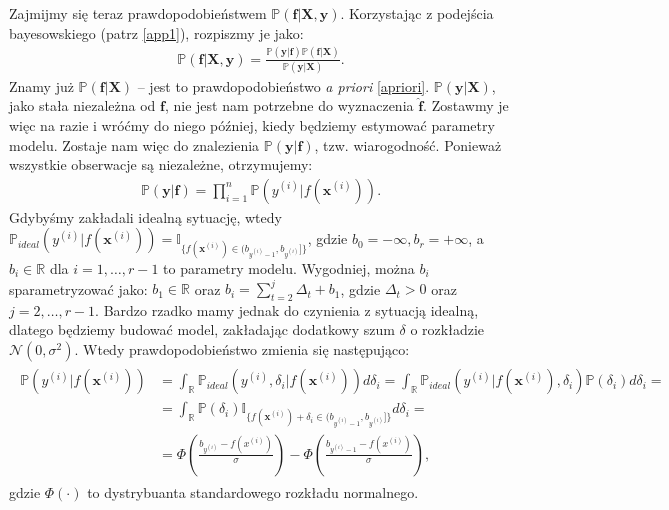 \documentclass{mini}
\begin{document}
Zajmijmy się teraz prawdopodobieństwem $\mathbb{P}(\mathbf{f} | \textbf{X}, \textbf{y})$. Korzystając z podejścia bayesowskiego (patrz \ref{app1}), rozpiszmy je jako:
\begin{align}\label{bayes}
\mathbb{P}(\mathbf{f} | \textbf{X}, \textbf{y}) 
=
\frac{
\mathbb{P}(\mathbf{y} | \textbf{f})
\mathbb{P}(\mathbf{f} | \textbf{X})
}{
\mathbb{P}(\mathbf{y} | \textbf{X})
}. 
\end{align}
Znamy już $\mathbb{P}(\mathbf{f} | \textbf{X})$ -- jest to prawdopodobieństwo \textit{a priori} \eqref{apriori}. $\mathbb{P}(\mathbf{y} | \textbf{X})$, jako stała niezależna od $\mathbf{f}$, nie jest nam potrzebne do wyznaczenia $\mathbf{\hat{f}}$. Zostawmy je więc na razie i wróćmy do niego później, kiedy będziemy estymować parametry modelu. Zostaje nam więc do znalezienia $\mathbb{P}(\mathbf{y} | \textbf{f})$, tzw. wiarogodność. Ponieważ wszystkie obserwacje są niezależne, otrzymujemy:
\begin{align}\label{prod}
\mathbb{P}(\mathbf{y} | \textbf{f}) 
=
\prod^n_{i=1}\mathbb{P}(y^{(i)} | f(\mathbf{x}^{(i)})).
\end{align}
Gdybyśmy zakładali idealną sytuację, wtedy $\mathbb{P}_{ideal} (y^{(i)}|f(\mathbf{x}^{(i)})) = \mathbb{I}_{\lbrace f(\mathbf{x}^{(i)})\in (b_{y^{(i)}-1}, b_{y^{(i)}}] \rbrace}$, gdzie $b_0=-\infty, b_r=+\infty$, a $b_i\in\mathbb{R}$ dla $i=1, \ldots, r-1$ to parametry modelu. Wygodniej, można $b_i$ sparametryzować jako: $b_1\in\mathbb{R}$ oraz $b_i = \sum_{t=2}^j\Delta_t+b_1$, gdzie $\Delta_t>0$ oraz $j=2, \ldots, r-1$. Bardzo rzadko mamy jednak do czynienia z sytuacją idealną, dlatego będziemy budować model, zakładając dodatkowy szum $\delta$ o rozkładzie $\mathcal{N}(0, \sigma^2)$. Wtedy prawdopodobieństwo zmienia się następująco:
\begin{align}\label{dystryb}
\begin{split}
\mathbb{P}(y^{(i)}|f(\mathbf{x}^{(i)})) 
&= 
\int_\mathbb{R} \mathbb{P}_{ideal} (y^{(i)},\delta_i | f(\mathbf{x}^{(i)}))d\delta_i
=
\int_\mathbb{R} \mathbb{P}_{ideal} (y^{(i)} | f(\mathbf{x}^{(i)}),\delta_i)\mathbb{P}(\delta_i)  d\delta_i=\\
&=
\int_\mathbb{R} \mathbb{P}(\delta_i)\mathbb{I}_{\lbrace f(\mathbf{x}^{(i)})+\delta_i\in (b_{y^{(i)}-1}, b_{y^{(i)}}] \rbrace}  d\delta_i=\\
&=
\Phi\left(\frac{b_{y^{(i)}}-f(x^{(i)})}{\sigma} \right) 
- 
\Phi\left( \frac{b_{y^{(i)}-1}-f(x^{(i)})}{\sigma} \right),
\end{split}
\end{align}
gdzie $\Phi(\cdot)$ to dystrybuanta standardowego rozkładu normalnego.
\end{document}
